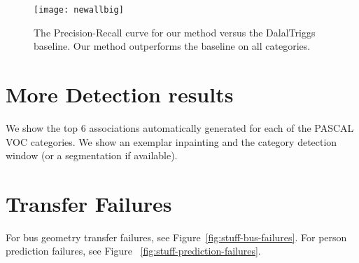 \documentclass[10pt,letterpaper]{article}
\begin{document}
\begin{figure*}[h!!]
\begin{centering}
\texttt{[image: newallbig]} \\
\label{fig:stuff-newall}
\caption{The Precision-Recall curve for our method versus the
  DalalTriggs baseline.  Our method outperforms the baseline on all
  categories.}
\end{centering}
\end{figure*}

\clearpage
\newpage

\section{More Detection results}
We show the top $6$ associations automatically generated for each of
the PASCAL VOC categories.  We show an exemplar inpainting and the
category detection window (or a segmentation if available).

















\section{Transfer Failures}
For bus geometry transfer failures, see
Figure~\ref{fig:stuff-bus-failures}.  For person prediction failures,
see Figure ~\ref{fig:stuff-prediction-failures}.

\end{document}
